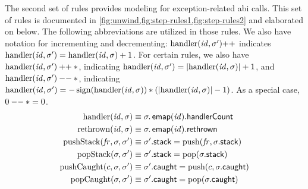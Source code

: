 The second set of rules provides modeling for exception-related \ac{abi} calls.
This set of rules is documented in \cref{fig:unwind,fig:step-rules1,fig:step-rules2} and elaborated on below.
The following abbreviations are utilized in those rules.
We also have notation for incrementing and decrementing: %
$\operatorname{handler}(\mathit{id},\sigma')\mathbin{++}$ indicates $\operatorname{handler}(\mathit{id},\sigma')=\operatorname{handler}(\mathit{id},\sigma)+1$.
For certain rules, we also have $\operatorname{handler}(\mathit{id},\sigma')\mathbin{++}*$, indicating $\operatorname{handler}(\mathit{id},\sigma')=\lvert\operatorname{handler}(\mathit{id},\sigma)\rvert+1$,
and $\operatorname{handler}(\mathit{id},\sigma')\mathbin{--}*$, indicating $\operatorname{handler}(\mathit{id},\sigma')=-\operatorname{sign}(\operatorname{handler}(\mathit{id},\sigma))*(\lvert\operatorname{handler}(\mathit{id},\sigma)\rvert-1)$.
As a special case, $0\mathbin{--}*=0$.
 \begin{align*}
  \operatorname{handler}(\mathit{id},\sigma) &\equiv \sigma.\operatorname{\mathsf{emap}}(\mathit{id}).\mathsf{handlerCount} \\
  \operatorname{rethrown}(\mathit{id},\sigma) &\equiv \sigma.\operatorname{\mathsf{emap}}(\mathit{id}).\mathsf{rethrown} \\
  \operatorname{pushStack}(\mathit{fr},\sigma,\sigma') &\equiv \sigma'.\mathsf{stack}=\operatorname{push}(\mathit{fr},\sigma.\mathsf{stack}) \\
  \operatorname{popStack}(\sigma,\sigma') &\equiv \sigma'.\mathsf{stack}=\operatorname{pop}(\sigma.\mathsf{stack}) \\
  \operatorname{pushCaught}(c,\sigma,\sigma') &\equiv \sigma'.\mathsf{caught}=\operatorname{push}(c,\sigma.\mathsf{caught}) \\
  \operatorname{popCaught}(\sigma,\sigma') &\equiv \sigma'.\mathsf{caught}=\operatorname{pop}(\sigma.\mathsf{caught})
\end{align*}

